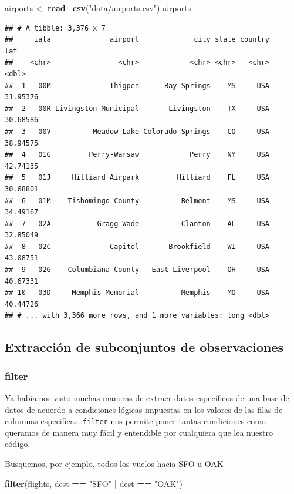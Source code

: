 \documentclass[]{article}
\newenvironment{Shaded}{\begin{snugshade}}{\end{snugshade}}
\newcommand{\KeywordTok}[1]{\textcolor[rgb]{0.13,0.29,0.53}{\textbf{#1}}}
\newcommand{\StringTok}[1]{\textcolor[rgb]{0.31,0.60,0.02}{#1}}
\newcommand{\OperatorTok}[1]{\textcolor[rgb]{0.81,0.36,0.00}{\textbf{#1}}}
\newcommand{\NormalTok}[1]{#1}
\begin{document}
\begin{Shaded}
\begin{Highlighting}[]
\NormalTok{airports <-}\StringTok{ }\KeywordTok{read_csv}\NormalTok{(}\StringTok{"data/airports.csv"}\NormalTok{)}
\NormalTok{airports}
\end{Highlighting}
\end{Shaded}

\begin{verbatim}
## # A tibble: 3,376 x 7
##     iata              airport             city state country      lat
##    <chr>                <chr>            <chr> <chr>   <chr>    <dbl>
##  1   00M              Thigpen      Bay Springs    MS     USA 31.95376
##  2   00R Livingston Municipal       Livingston    TX     USA 30.68586
##  3   00V          Meadow Lake Colorado Springs    CO     USA 38.94575
##  4   01G         Perry-Warsaw            Perry    NY     USA 42.74135
##  5   01J     Hilliard Airpark         Hilliard    FL     USA 30.68801
##  6   01M    Tishomingo County          Belmont    MS     USA 34.49167
##  7   02A           Gragg-Wade          Clanton    AL     USA 32.85049
##  8   02C              Capitol       Brookfield    WI     USA 43.08751
##  9   02G    Columbiana County   East Liverpool    OH     USA 40.67331
## 10   03D     Memphis Memorial          Memphis    MO     USA 40.44726
## # ... with 3,366 more rows, and 1 more variables: long <dbl>
\end{verbatim}

\subsection{Extracción de subconjuntos de
observaciones}\label{extraccion-de-subconjuntos-de-observaciones}

\subsubsection{filter}\label{filter}

Ya habíamos visto muchas maneras de extraer datos específicos de una
base de datos de acuerdo a condiciones lógicas impuestas en los valores
de las filas de columnas especificas. \texttt{filter} nos permite poner
tantas condiciones como queramos de manera muy fácil y entendible por
cualquiera que lea nuestro código.

Busquemos, por ejemplo, todos los vuelos hacia SFO u OAK

\begin{Shaded}
\begin{Highlighting}[]
\KeywordTok{filter}\NormalTok{(flights, dest }\OperatorTok{==}\StringTok{ "SFO"} \OperatorTok{|}\StringTok{ }\NormalTok{dest }\OperatorTok{==}\StringTok{ "OAK"}\NormalTok{)}
\end{Highlighting}
\end{Shaded}
\end{document}
